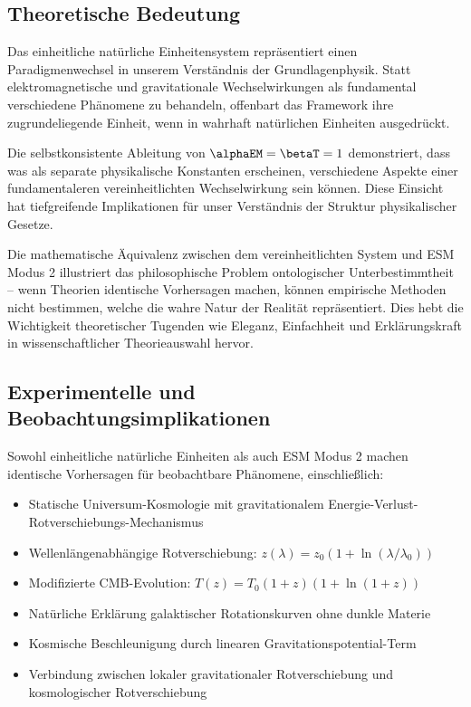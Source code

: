 	\subsection{Theoretische Bedeutung}
	\label{subsec:theoretical_significance}
	
	Das einheitliche natürliche Einheitensystem repräsentiert einen Paradigmenwechsel in unserem Verständnis der Grundlagenphysik. Statt elektromagnetische und gravitationale Wechselwirkungen als fundamental verschiedene Phänomene zu behandeln, offenbart das Framework ihre zugrundeliegende Einheit, wenn in wahrhaft natürlichen Einheiten ausgedrückt.
	
	Die selbstkonsistente Ableitung von $\alphaEM = \betaT = 1$ demonstriert, dass was als separate physikalische Konstanten erscheinen, verschiedene Aspekte einer fundamentaleren vereinheitlichten Wechselwirkung sein können. Diese Einsicht hat tiefgreifende Implikationen für unser Verständnis der Struktur physikalischer Gesetze.
	
	Die mathematische Äquivalenz zwischen dem vereinheitlichten System und ESM Modus 2 illustriert das philosophische Problem ontologischer Unterbestimmtheit – wenn Theorien identische Vorhersagen machen, können empirische Methoden nicht bestimmen, welche die wahre Natur der Realität repräsentiert. Dies hebt die Wichtigkeit theoretischer Tugenden wie Eleganz, Einfachheit und Erklärungskraft in wissenschaftlicher Theorieauswahl hervor.
	
	\subsection{Experimentelle und Beobachtungsimplikationen}
	\label{subsec:experimental_implications}
	
	Sowohl einheitliche natürliche Einheiten als auch ESM Modus 2 machen identische Vorhersagen für beobachtbare Phänomene, einschließlich:
	
	\begin{itemize}
		\item Statische Universum-Kosmologie mit gravitationalem Energie-Verlust-Rotverschiebungs-Mechanismus
		\item Wellenlängenabhängige Rotverschiebung: $z(\lambda) = z_0(1 + \ln(\lambda/\lambda_0))$
		\item Modifizierte CMB-Evolution: $T(z) = T_0(1+z)(1+\ln(1+z))$
		\item Natürliche Erklärung galaktischer Rotationskurven ohne dunkle Materie
		\item Kosmische Beschleunigung durch linearen Gravitationspotential-Term
		\item Verbindung zwischen lokaler gravitationaler Rotverschiebung und kosmologischer Rotverschiebung
	\end{itemize}
	
